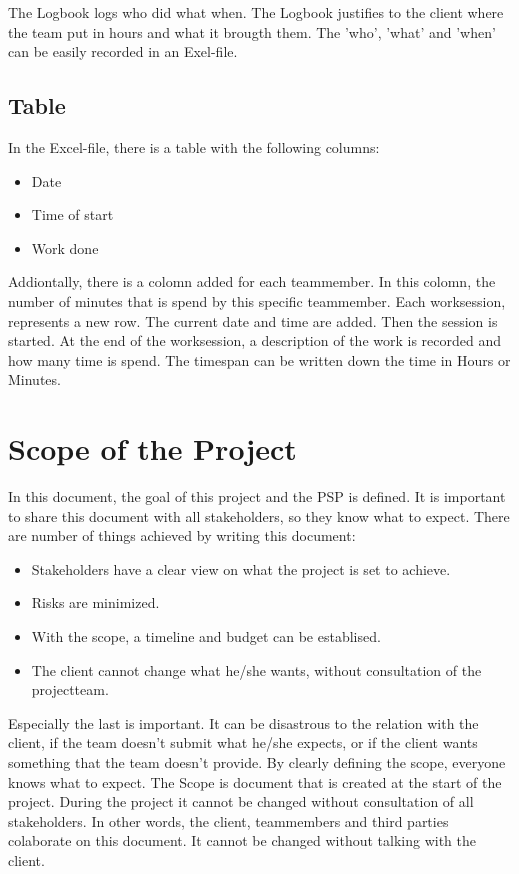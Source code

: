 \documentclass[10pt]{report}
\begin{document}
The Logbook logs who did what when. The Logbook justifies to the client where the team put in hours and what it brougth them. The 'who', 'what' and 'when' can be easily recorded in an Exel-file.

\subsection{Table}

In the Excel-file, there is a table with the following columns:

\begin{itemize}
	\item Date
	\item Time of start
	\item Work done
\end{itemize}

Addiontally, there is a colomn added for each teammember. In this colomn, the number of minutes that is spend by this specific teammember. Each worksession, represents a new row. The current date and time are added. Then the session is started. At the end of the worksession, a description of the work is recorded and how many time is spend. The timespan can be written down the time in Hours or Minutes.

\newpage

\section{Scope of the Project}

In this document, the goal of this project and the PSP is defined. It is important to share this document with all stakeholders, so they know what to expect. There are number of things achieved by writing this document:

\begin{itemize}
	\item Stakeholders have a clear view on what the project is set to achieve.
	\item Risks are minimized.
	\item With the scope, a timeline and budget can be establised.
	\item The client cannot change what he/she wants, without consultation of the projectteam.
\end{itemize}

Especially the last is important. It can be disastrous to the relation with the client, if the team doesn't submit what he/she expects, or if the client wants something that the team doesn't provide. By clearly defining the scope, everyone knows what to expect. The Scope is document that is created at the start of the project. During the project it cannot be changed without consultation of all stakeholders. In other words, the client, teammembers and third parties colaborate on this document. It cannot be changed without talking with the client.
\end{document}
